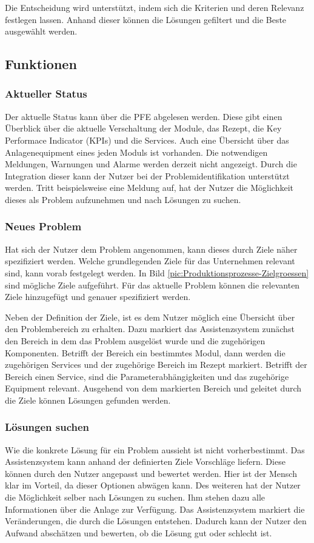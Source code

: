 Die Entscheidung wird unterstützt, indem sich die Kriterien und deren Relevanz festlegen lassen. Anhand dieser können die Lösungen gefiltert und die Beste ausgewählt werden.

\subsection{Funktionen}


\subsubsection*{Aktueller Status}
Der aktuelle Status kann über die PFE abgelesen werden. Diese gibt einen Überblick über die aktuelle Verschaltung der Module, das Rezept, die Key Performace Indicator (KPIs) und die Services. Auch eine Übersicht über das Anlagenequipment eines jeden Moduls ist vorhanden. Die notwendigen Meldungen, Warnungen und Alarme werden derzeit nicht angezeigt. Durch die Integration dieser kann der Nutzer bei der Problemidentifikation unterstützt werden. Tritt beispielsweise eine Meldung auf, hat der Nutzer die Möglichkeit dieses als Problem aufzunehmen und nach Lösungen zu suchen.

\subsubsection*{Neues Problem}
Hat sich der Nutzer dem Problem angenommen, kann dieses durch Ziele näher spezifiziert werden. Welche grundlegenden Ziele für das Unternehmen relevant sind, kann vorab festgelegt werden. In Bild \ref{pic:Produktionsprozesse-Zielgroessen} sind mögliche Ziele aufgeführt. Für das aktuelle Problem können die relevanten Ziele hinzugefügt und genauer spezifiziert werden.

Neben der Definition der Ziele, ist es dem Nutzer möglich eine Übersicht über den Problembereich zu erhalten. Dazu markiert das Assistenzsystem zunächst den Bereich in dem das Problem ausgelöst wurde und die zugehörigen Komponenten. Betrifft der Bereich ein bestimmtes Modul, dann werden die zugehörigen Services und der zugehörige Bereich im Rezept markiert. Betrifft der Bereich einen Service, sind die Parameterabhängigkeiten und das zugehörige Equipment relevant. Ausgehend von dem markierten Bereich und geleitet durch die Ziele können Lösungen gefunden werden.

\subsubsection*{Lösungen suchen }
Wie die konkrete Lösung für ein Problem aussieht ist nicht vorherbestimmt. Das Assistenzsystem kann anhand der definierten Ziele Vorschläge liefern. Diese können durch den Nutzer angepasst und bewertet werden. Hier ist der Mensch klar im Vorteil, da dieser Optionen abwägen kann. Des weiteren hat der Nutzer die Möglichkeit selber nach Lösungen zu suchen. Ihm stehen dazu alle Informationen über die Anlage zur Verfügung. Das Assistenzsystem markiert die Veränderungen, die durch die Lösungen entstehen. Dadurch kann der Nutzer den Aufwand abschätzen und bewerten, ob die Lösung gut oder schlecht ist.

